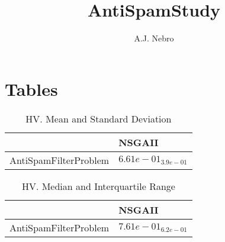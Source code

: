 \documentclass{article}
\title{AntiSpamStudy}
\author{A.J. Nebro}
\begin{document}
\maketitle
\section{Tables}

\begin{table}
\caption{HV. Mean and Standard Deviation}
\label{table: HV}
\centering
\begin{scriptsize}
\begin{tabular}{ll}
\hline &  NSGAII\\
\hline 
AntiSpamFilterProblem & \cellcolor{gray95}$  6.61e-01_{ 3.9e-01}$ \\
\hline
\end{tabular}
\end{scriptsize}
\end{table}

\begin{table}
\caption{HV. Median and Interquartile Range}
\label{table: HV}
\centering
\begin{scriptsize}
\begin{tabular}{ll}
\hline &  NSGAII\\
\hline 
AntiSpamFilterProblem & \cellcolor{gray95}$  7.61e-01_{ 6.2e-01}$ \\
\hline
\end{tabular}
\end{scriptsize}
\end{table}
\end{document}
